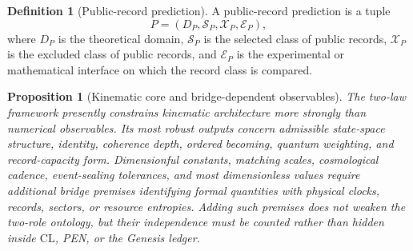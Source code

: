\documentclass[11pt]{article}
\theoremstyle{plain}
\newtheorem{proposition}[theorem]{Proposition}
\theoremstyle{definition}
\newtheorem{definition}[theorem]{Definition}
\theoremstyle{remark}
\newcommand{\CL}{\mathrm{CL}}
\begin{document}
\begin{definition}[Public-record prediction]
A public-record prediction is a tuple
\[
P=(D_P,\mathcal{S}_P,\mathcal{X}_P,\mathcal{E}_P),
\]
where \(D_P\) is the theoretical domain, \(\mathcal{S}_P\) is the selected class of public records, \(\mathcal{X}_P\) is the excluded class of public records, and \(\mathcal{E}_P\) is the experimental or mathematical interface on which the record class is compared.
\end{definition}

\begin{proposition}[Kinematic core and bridge-dependent observables]
The two-law framework presently constrains kinematic architecture more strongly than numerical observables. Its most robust outputs concern admissible state-space structure, identity, coherence depth, ordered becoming, quantum weighting, and record-capacity form. Dimensionful constants, matching scales, cosmological cadence, event-sealing tolerances, and most dimensionless values require additional bridge premises identifying formal quantities with physical clocks, records, sectors, or resource entropies. Adding such premises does not weaken the two-role ontology, but their independence must be counted rather than hidden inside \(\CL\), PEN, or the Genesis ledger.
\end{proposition}
\end{document}
